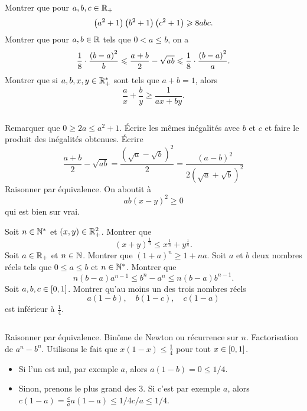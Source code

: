 \documentclass{magnolia}
\begin{document}




\begin{questions}
\question Montrer que pour $a,b,c\in\mathbb{R}_+$
  \[\left(a^2+1\right)\left(b^2+1\right)\left(c^2+1\right)\geqslant 8abc.\]
\question Montrer que pour $a,b\in\mathbb{R}$ tels que $0<a\leq b$, on a
  \[\frac{1}{8}\cdot\frac{\left(b-a\right)^2}{b}\leqslant\frac{a+b}{2}-\sqrt{ab}
    \leqslant\frac{1}{8}\cdot\frac{\left(b-a\right)^2}{a}.\]
\question Montrer que si $a,b,x,y\in\mathbb{R}_+^*$ sont tels que $a+b=1$, alors
  \[\frac{a}{x}+\frac{b}{y}\geq\frac{1}{ax+by}.\]
\end{questions}
\begin{sol}
$\quad$
\begin{questions}
\question Remarquer que $0\geq 2a\leq a^2+1$. Écrire les mêmes inégalités avec
  $b$ et $c$ et faire le produit des inégalités obtenues.
\question Écrire
  \[\frac{a+b}{2}-\sqrt{ab}=\frac{(\sqrt{a}-\sqrt{b})^2}{2}=
    \frac{(a-b)^2}{2(\sqrt{a}+\sqrt{b})^2}\]
\question Raisonner par équivalence. On aboutit à
  \[ab(x-y)^2\geq 0\]
  qui est bien sur vrai.
\end{questions}
\end{sol}

\begin{questions}
\question Soit $n\in{\mathbb{N}^*}$ et $(x,y)\in\mathbb{R}_+^2$. Montrer que
  \[(x+y)^{\frac{1}{n}}\leq x^{\frac{1}{n}}+y^{\frac{1}{n}}.\]
\question Soit $a\in\mathbb{R}_+$ et $n\in\mathbb{N}$. Montrer que $(1+a)^n\geq 1+na$.
\question Soit $a$ et $b$ deux nombres réels tels que $0\leq a\leq b$ et  
  $n\in{\mathbb{N}^*}$. Montrer que
  \[n(b-a)a^{n-1}\leq b^n-a^n\leq n(b-a)b^{n-1}.\]
\question Soit $a,b,c\in\left[0,1\right]$. Montrer qu'au moins un des trois
  nombres réels
  \[a(1-b), \quad b(1-c), \quad c(1-a)\]
  est inférieur à $\frac{1}{4}$.
\end{questions}
\begin{sol}
$\quad$
\begin{questions}
\question Raisonner par équivalence.
\question Binôme de Newton ou récurrence sur $n$.
\question Factorisation de $a^n-b^n$.
\question Utilisons le fait que $x(1-x)\leq\frac{1}{4}$ pour tout
  $x\in\left[0,1\right]$.
  \begin{itemize}
  \item Si l'un est nul, par exemple $a$, alors $a(1-b)=0\leq 1/4$.
  \item Sinon, prenons le plus grand des $3$. Si c'est par exemple $a$, alors $c(1-a)=\frac{c}{a}a(1-a)\leq 1/4 c/a \leq 1/4$.
  \end{itemize}
\end{questions}
\end{sol}
\end{document}
